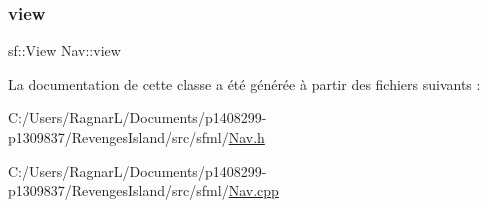 \subsubsection{\texorpdfstring{view}{view}}
{\footnotesize\ttfamily sf\+::\+View Nav\+::view}



La documentation de cette classe a été générée à partir des fichiers suivants \+:\begin{DoxyCompactItemize}
\item 
C\+:/\+Users/\+Ragnar\+L/\+Documents/p1408299-\/p1309837/\+Revenges\+Island/src/sfml/\hyperlink{_nav_8h}{Nav.\+h}\item 
C\+:/\+Users/\+Ragnar\+L/\+Documents/p1408299-\/p1309837/\+Revenges\+Island/src/sfml/\hyperlink{_nav_8cpp}{Nav.\+cpp}\end{DoxyCompactItemize}
